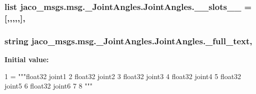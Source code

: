 \subsubsection[{\texorpdfstring{\+\_\+\+\_\+slots\+\_\+\+\_\+}{__slots__}}]{\setlength{\rightskip}{0pt plus 5cm}list jaco\+\_\+msgs.\+msg.\+\_\+\+Joint\+Angles.\+Joint\+Angles.\+\_\+\+\_\+slots\+\_\+\+\_\+ = \mbox{[}\textquotesingle{},\textquotesingle{},\textquotesingle{},\textquotesingle{},\textquotesingle{},\textquotesingle{}\mbox{]}\hspace{0.3cm}{\ttfamily [static]}, {\ttfamily [private]}}\hypertarget{classjaco__msgs_1_1msg_1_1__JointAngles_1_1JointAngles_a3e737e50c253271aa19ed12620925721}{}\label{classjaco__msgs_1_1msg_1_1__JointAngles_1_1JointAngles_a3e737e50c253271aa19ed12620925721}
\subsubsection[{\texorpdfstring{\+\_\+full\+\_\+text}{_full_text}}]{\setlength{\rightskip}{0pt plus 5cm}string jaco\+\_\+msgs.\+msg.\+\_\+\+Joint\+Angles.\+Joint\+Angles.\+\_\+full\+\_\+text\hspace{0.3cm}{\ttfamily [static]}, {\ttfamily [private]}}\hypertarget{classjaco__msgs_1_1msg_1_1__JointAngles_1_1JointAngles_a84e8ef5d8c1e8067d101cd9151305359}{}\label{classjaco__msgs_1_1msg_1_1__JointAngles_1_1JointAngles_a84e8ef5d8c1e8067d101cd9151305359}
{\bfseries Initial value\+:}
\begin{DoxyCode}
1 = \textcolor{stringliteral}{"""float32 joint1}
2 \textcolor{stringliteral}{float32 joint2}
3 \textcolor{stringliteral}{float32 joint3}
4 \textcolor{stringliteral}{float32 joint4}
5 \textcolor{stringliteral}{float32 joint5}
6 \textcolor{stringliteral}{float32 joint6}
7 \textcolor{stringliteral}{}
8 \textcolor{stringliteral}{"""}
\end{DoxyCode}
